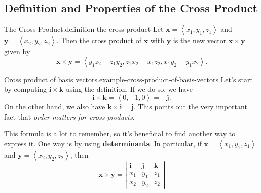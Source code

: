 \documentclass[10pt,]{book}
\newcommand{\terminology}[1]{\textbf{#1}}
\numberwithin{equation}{section}
\newcommand{\vv}[1]{\mathbf{#1}}
\newcommand{\dotprod}[1]{\left\langle #1 \right\rangle}
\begin{document}
\subsection[{Definition and Properties of the Cross Product}]{Definition and Properties of the Cross Product}\label{subsection-definition-and-properties-of-the-cross-product}
\begin{definition}{The Cross Product.}{definition-the-cross-product}%
\hypertarget{p-1166}{}%
Let \(\vv{x} = \dotprod{x_{1},y_{1},z_{1}}\) and \(\vv{y} = \dotprod{x_{2},y_{2},z_{2}}\). Then the cross product of \(\vv{x}\) with \(\vv{y}\) is the new vector \(\vv{x}\times\vv{y}\) given by%
%
\begin{equation*}
\vv{x}\times\vv{y} = \dotprod{y_{1}z_{2}-z_{1}y_{2}, z_{1}x_{2}-x_{1}z_{2}, x_{1}y_{2} - y_{1}x_{2}}.
\end{equation*}
\end{definition}
\begin{example}{Cross product of basis vectors.}{example-cross-product-of-basis-vectors}%
\hypertarget{p-1167}{}%
Let's start by computing \(\vv{i}\times\vv{k}\) using the definition. If we do so, we have%
%
\begin{equation*}
\vv{i}\times\vv{k} = \dotprod{0,-1,0} = -\vv{j}.
\end{equation*}
\hypertarget{p-1168}{}%
On the other hand, we also have \(\vv{k}\times\vv{i} = \vv{j}\). This points out the very important fact that \emph{order matters for cross products}.%
\end{example}
\hypertarget{p-1169}{}%
This formula is a lot to remember, so it's beneficial to find another way to express it. One way is by using \terminology{determinants}. In particular, if \(\vv{x} = \dotprod{x_{1},y_{1},z_{1}}\) and \(\vv{y} = \dotprod{x_{2},y_{2},z_{2}}\), then%
%
\begin{equation}
\vv{x}\times\vv{y} = \left|\begin{array}{ccc}
\vv{i} & \vv{j} & \vv{k} \\ x_{1} & y_{1} & z_{1} \\ x_{2} & y_{2} & z_{2} \end{array}\right|\label{equation-cross-product-determinant}
\end{equation}
\end{document}
